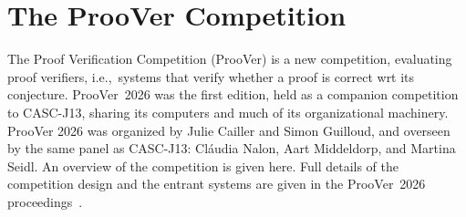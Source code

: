 \documentclass[aic]{iosart2x}
\newcommand{\THIS}{\mbox{CASC-J13}}
\begin{document}

\section{The ProoVer Competition}
\label{ProoVer}

The Proof Verification Competition (ProoVer) is a new competition, evaluating proof
verifiers, i.e.,~systems that verify whether a proof is correct wrt its conjecture. 
ProoVer~2026 was the first edition, held as a companion competition to \THIS{}, sharing its 
computers and much of its organizational machinery.
ProoVer 2026 was organized by Julie Cailler and Simon Guilloud, and overseen by the same panel 
as \THIS{}: Cl\'audia Nalon, Aart Middeldorp, and Martina Seidl.
An overview of the competition is given here.
Full details of the competition design and the entrant systems are given in the 
ProoVer~2026 proceedings~\cite{CG26}. 
\end{document}
